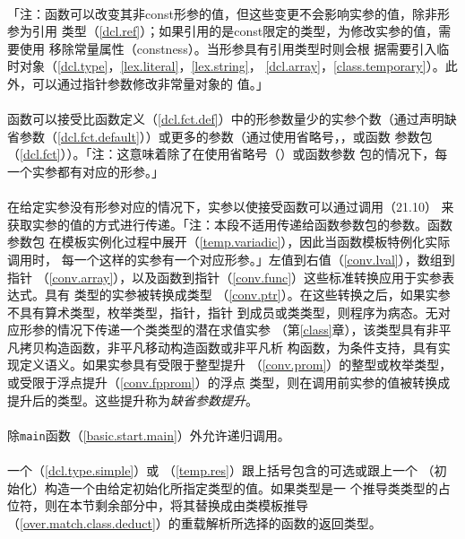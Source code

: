 \paragraph{}
「注：函数可以改变其非const形参的值，但这些变更不会影响实参的值，除非形参为引用
类型（\ref{dcl.ref}）；如果引用的是const限定的类型，为修改实参的值，需要使用
移除常量属性（constness）。当形参具有引用类型时则会根
据需要引入临时对象（\ref{dcl.type}，\ref{lex.literal}，\ref{lex.string}，
\ref{dcl.array}，\ref{class.temporary}）。此外，可以通过指针参数修改非常量对象的
值。」

\paragraph{}
函数可以接受比函数定义（\ref{dcl.fct.def}）中的形参数量少的实参个数（通过声明缺
省参数（\ref{dcl.fct.default}））或更多的参数（通过使用省略号，，或函数
参数包（\ref{dcl.fct}））。「注：这意味着除了在使用省略号（）或函数参数
包的情况下，每一个实参都有对应的形参。」

\paragraph{}
在给定实参没有形参对应的情况下，实参以使接受函数可以通过调用（21.10）
来获取实参的值的方式进行传递。「注：本段不适用传递给函数参数包的参数。函数参数包
在模板实例化过程中展开（\ref{temp.variadic}），因此当函数模板特例化实际调用时，
每一个这样的实参有一个对应形参。」左值到右值（\ref{conv.lval}），数组到指针
（\ref{conv.array}），以及函数到指针（\ref{conv.func}）这些标准转换应用于实参表
达式。具有 类型的实参被转换成类型
（\ref{conv.ptr}）。在这些转换之后，如果实参不具有算术类型，枚举类型，指针，指针
到成员或类类型，则程序为病态。无对应形参的情况下传递一个类类型的潜在求值实参
（第\ref{class}章），该类型具有非平凡拷贝构造函数，非平凡移动构造函数或非平凡析
构函数，为条件支持，具有实现定义语义。如果实参具有受限于整型提升
（\ref{conv.prom}）的整型或枚举类型，或受限于浮点提升（\ref{conv.fpprom}）的浮点
类型，则在调用前实参的值被转换成提升后的类型。这些提升称为\textit{缺省参数提升}。

\paragraph{}
除\texttt{main}函数（\ref{basic.start.main}）外允许递归调用。

\paragraph{}
一个（\ref{dcl.type.simple}）或
（\ref{temp.res}）跟上括号包含的可选或跟上一个
（初始化）构造一个由给定初始化所指定类型的值。如果类型是一
个推导类类型的占位符，则在本节剩余部分中，将其替换成由类模板推导
（\ref{over.match.class.deduct}）的重载解析所选择的函数的返回类型。

